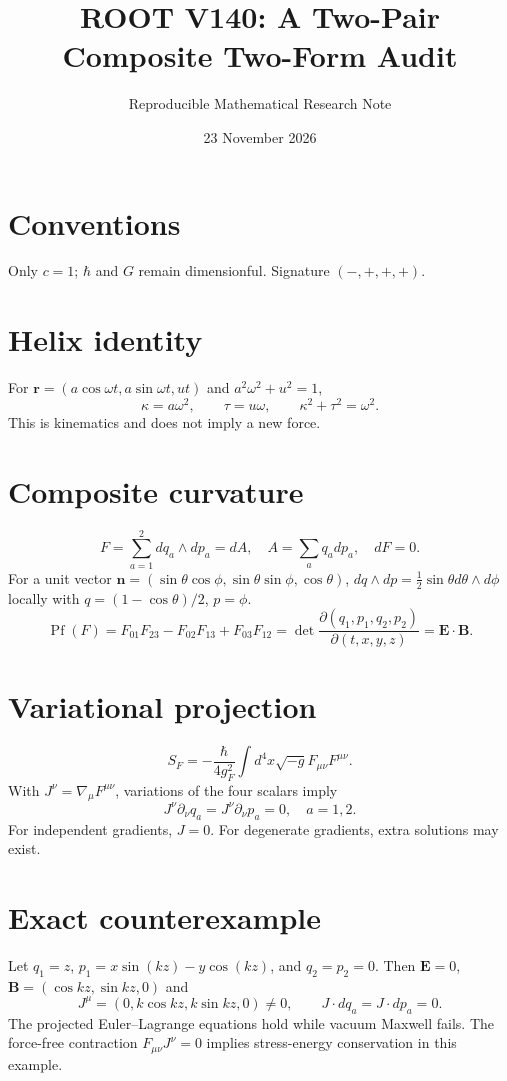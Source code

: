 \documentclass[11pt]{article}
\title{ROOT V140: A Two-Pair Composite Two-Form Audit}
\author{Reproducible Mathematical Research Note}
\date{23 November 2026}
\begin{document}
\maketitle
\section{Conventions}
Only $c=1$; $\hbar$ and $G$ remain dimensionful. Signature $(-,+,+,+)$.
\section{Helix identity}
For $\mathbf r=(a\cos\omega t,a\sin\omega t,ut)$ and $a^2\omega^2+u^2=1$,
\begin{equation}\kappa=a\omega^2,\qquad \tau=u\omega,\qquad \kappa^2+\tau^2=\omega^2.\end{equation}
This is kinematics and does not imply a new force.
\section{Composite curvature}
\begin{equation}F=\sum_{a=1}^{2}dq_a\wedge dp_a=dA,\quad A=\sum_a q_a dp_a,\quad dF=0.\end{equation}
For a unit vector $\mathbf n=(\sin\theta\cos\phi,\sin\theta\sin\phi,\cos\theta)$,
$dq\wedge dp=\tfrac12\sin\theta d\theta\wedge d\phi$ locally with $q=(1-\cos\theta)/2$, $p=\phi$.
\begin{equation}\operatorname{Pf}(F)=F_{01}F_{23}-F_{02}F_{13}+F_{03}F_{12}=\det \frac{\partial(q_1,p_1,q_2,p_2)}{\partial(t,x,y,z)}=\mathbf E\cdot\mathbf B.\end{equation}
\section{Variational projection}
\begin{equation}S_F=-\frac{\hbar}{4g_F^2}\int d^4x\sqrt{-g}F_{\mu\nu}F^{\mu\nu}.\end{equation}
With $J^\nu=\nabla_\mu F^{\mu\nu}$, variations of the four scalars imply
\begin{equation}J^\nu\partial_\nu q_a=J^\nu\partial_\nu p_a=0,\quad a=1,2.\end{equation}
For independent gradients, $J=0$. For degenerate gradients, extra solutions may exist.
\section{Exact counterexample}
Let $q_1=z$, $p_1=x\sin(kz)-y\cos(kz)$, and $q_2=p_2=0$.
Then $\mathbf E=0$, $\mathbf B=(\cos kz,\sin kz,0)$ and
\begin{equation}J^\mu=(0,k\cos kz,k\sin kz,0)\ne0,\qquad J\cdot dq_a=J\cdot dp_a=0.\end{equation}
The projected Euler--Lagrange equations hold while vacuum Maxwell fails.
The force-free contraction $F_{\mu\nu}J^\nu=0$ implies stress-energy conservation in this example.
\end{document}

